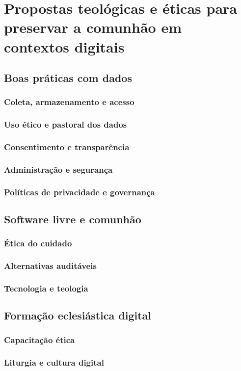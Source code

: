 \newpage
\section{Propostas teológicas e éticas para preservar a comunhão em contextos digitais}

\subsection{Boas práticas com dados}
\subsubsection{Coleta, armazenamento e acesso}

\subsubsection{Uso ético e pastoral dos dados}

\subsubsection{Consentimento e transparência}

\subsubsection{Administração e segurança}

\subsubsection{Políticas de privacidade e governança}

\subsection{Software livre e comunhão}
\subsubsection{Ética do cuidado}

\subsubsection{Alternativas auditáveis}

\subsubsection{Tecnologia e teologia}

\subsection{Formação eclesiástica digital}
\subsubsection{Capacitação ética}

\subsubsection{Liturgia e cultura digital}
